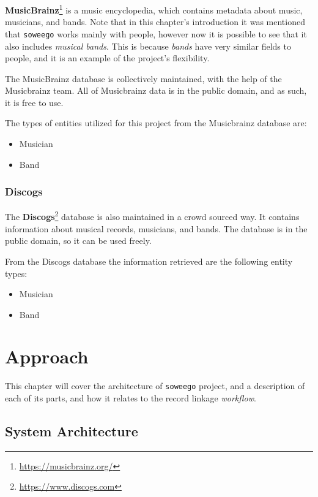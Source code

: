 \documentclass[epsfig,a4paper,11pt,titlepage,twoside,openany]{book}
\newcommand{\footurl}[1]{\footnote{\url{#1}}}
\newcommand{\soweego}[0]{\texttt{soweego}\xspace}
\begin{document}
\textbf{MusicBrainz}\footurl{https://musicbrainz.org/} is a music encyclopedia, which contains metadata about music, musicians, and bands. 
Note that in this chapter’s introduction it was mentioned that \texttt{soweego} works mainly with people, however now it is possible to see that it also includes \textit{musical bands}. This is because \textit{bands} have very similar fields to people, and it is an example of the project's flexibility.

The MusicBrainz database is collectively maintained, with the help of the Musicbrainz team. All of Musicbrainz data is in the public domain, and as such, it is free to use.

The types of entities utilized for this project from the Musicbrainz database are:

\begin{itemize}
\item Musician
\item Band
\end{itemize}


\subsection{Discogs}
\label{sec:catalog-discogs}

The \textbf{Discogs}\footurl{https://www.discogs.com} database is also maintained in a crowd sourced way. It contains information about musical records, musicians, and bands. The database is in the public domain, so it can be used freely.

From the Discogs database the information retrieved are the following entity types:

\begin{itemize}
\item Musician
\item Band
\end{itemize}


\chapter{Approach} 
\label{chap:approach}


This chapter will cover the architecture of \soweego project, and a description of each of its parts, and how it relates to the record linkage \textit{workflow}.

\section{System Architecture}
\label{sec:system-architecture}
\end{document}
